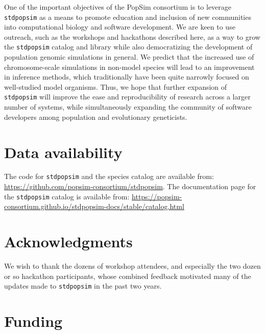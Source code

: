 \documentclass[hidelinks]{article}
\newcommand{\stdpopsim}{\texttt{stdpopsim}\xspace}
\begin{document}
One of the important objectives of the PopSim consortium is to leverage \stdpopsim as a means to promote education and inclusion of new communities into
computational biology and software development.
We are keen to use outreach, such as the workshops and hackathons described here, 
as a way to grow the \stdpopsim catalog and library while also democratizing the development of population genomic simulations in general.
We predict that the increased use of chromosome-scale simulations in non-model species will lead to an improvement in inference methods,
which traditionally have been quite narrowly focused on well-studied model organisms.
Thus, we hope that further expansion of \stdpopsim will improve the ease and reproducibility of research across a larger number of systems,
while simultaneously expanding the community of software developers among population and evolutionary geneticists.


\section*{Data availability}\label{acknowledgements}

The code for \stdpopsim and the species catalog are available from: \href{https://github.com/popsim-consortium/stdpopsim}
{https://github.com/popsim-consortium/stdpopsim}.
%
The documentation page for the \stdpopsim catalog is available from:
\href{https://popsim-consortium.github.io/stdpopsim-docs/stable/catalog.html}
{https://popsim-consortium.github.io/stdpopsim-docs/stable/catalog.html}

\section*{Acknowledgments}\label{acknowledgements}

We wish to thank the dozens of workshop attendees,
and especially the two dozen or so hackathon participants,
whose combined feedback motivated many of the updates made to \stdpopsim in the past two years.

\section*{Funding}
    \label{funding}
\end{document}
